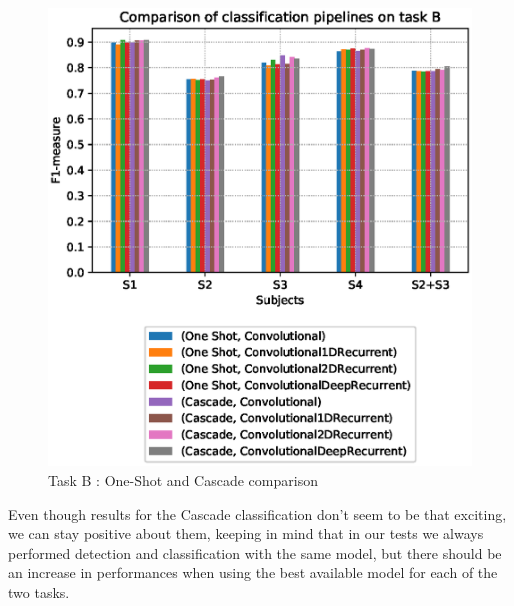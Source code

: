 \begin{figure}[t]
	\centering
	\includegraphics[scale=.6]{figure/B_pipeline_comparison}
	\caption{Task B : One-Shot and Cascade comparison}
	\label{fig:B_comp}
\end{figure}
Even though results for the Cascade classification don't seem to be that exciting, we can stay positive about them, keeping in mind that in our tests we always performed detection and classification with the same model, but there should be an increase in performances when using the best available model for each of the two tasks.

